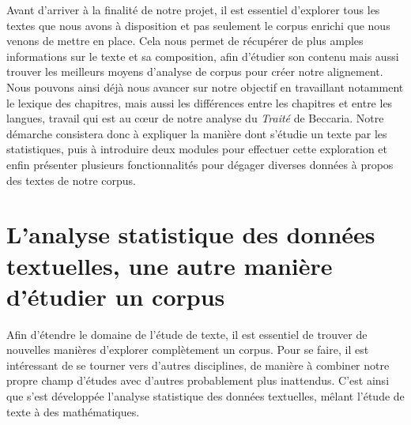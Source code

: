 
Avant d'arriver à la finalité de notre projet, il est essentiel d'explorer tous les textes que nous avons à disposition et pas seulement le corpus enrichi que nous venons de mettre en place. Cela nous permet de récupérer de plus amples informations sur le texte et sa composition, afin d'étudier son contenu mais aussi trouver les meilleurs moyens d'analyse de corpus pour créer notre alignement. Nous pouvons ainsi déjà nous avancer sur notre objectif en travaillant notamment le lexique des chapitres, mais aussi les différences entre les chapitres et entre les langues, travail qui est au c\oe ur de notre analyse du \emph{Traité} de Beccaria. Notre démarche consistera donc à expliquer la manière dont s'étudie un texte par les statistiques, puis à introduire deux modules pour effectuer cette exploration et enfin présenter plusieurs fonctionnalités pour dégager diverses données à propos des textes de notre corpus. 

\section{L'analyse statistique des données textuelles, une autre manière d'étudier un corpus}
Afin d'étendre le domaine de l'étude de texte, il est essentiel de trouver de nouvelles manières d'explorer complètement un corpus. Pour se faire, il est intéressant de se tourner vers d'autres disciplines, de manière à combiner notre propre champ d'études avec d'autres probablement plus inattendus. C'est ainsi que s'est développée l'analyse statistique des données textuelles, mêlant l'étude de texte à des mathématiques.

